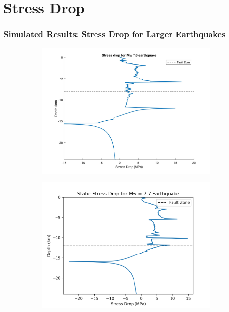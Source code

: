 \documentclass{beamer}
\begin{document}
\section{Stress Drop}
\begin{frame}
    \frametitle{Simulated Results: Stress Drop for Larger Earthquakes}
    \begin{figure}
        \begin{subfigure}[b]{0.5\textwidth}
            \includegraphics[width=\textwidth]{images/result8km/stress_drop_7} 
        \end{subfigure}%
        \begin{subfigure}[b]{0.5\textwidth}
            \includegraphics[width=\textwidth]{images/result12km/stress_drop_7}
        \end{subfigure}%
    \end{figure}
\end{frame}
\end{document}
